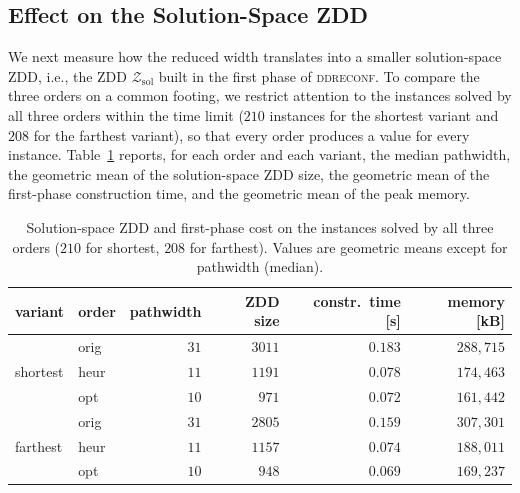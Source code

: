 \documentclass[conference]{IEEEtran}
\newcommand{\zsol}{\mathcal{Z}_{\mathrm{sol}}}
\newcommand{\OrigDecom}{\textsf{orig}\xspace}
\newcommand{\HeurDecom}{\textsf{heur}\xspace}
\newcommand{\OptDecom}{\textsf{opt}\xspace}
\begin{document}
\subsection{Effect on the Solution-Space ZDD}
\label{subsec:zddsize}
 
We next measure how the reduced width translates into a smaller solution-space
ZDD, i.e., the ZDD $\zsol$ built in the first phase of \textsc{ddreconf}.
To compare the three orders on a common footing, we restrict attention to the
instances solved by all three orders within the time limit ($210$ instances for
the shortest variant and $208$ for the farthest variant), so that every order
produces a value for every instance.
Table~\ref{tab:zddsize} reports, for each order and each variant, the median
pathwidth, the geometric mean of the solution-space ZDD size, the geometric mean
of the first-phase construction time, and the geometric mean of the peak memory.
 
\begin{table}[t]
  \centering
  \caption{Solution-space ZDD and first-phase cost on the instances solved by all
  three orders ($210$ for shortest, $208$ for farthest). Values are geometric
  means except for pathwidth (median).}
  \label{tab:zddsize}
  \begin{tabular}{llrrrr}
    \hline
    variant & order & pathwidth & ZDD size & constr.\ time [s] & memory [kB] \\
    \hline
    \multirow{3}{*}{shortest}
      & \OrigDecom & $31$ & $3011$ & $0.183$ & $288{,}715$ \\
      & \HeurDecom & $11$ & $1191$ & $0.078$ & $174{,}463$ \\
      & \OptDecom  & $10$ & $\phantom{0}971$ & $0.072$ & $161{,}442$ \\
    \hline
    \multirow{3}{*}{farthest}
      & \OrigDecom & $31$ & $2805$ & $0.159$ & $307{,}301$ \\
      & \HeurDecom & $11$ & $1157$ & $0.074$ & $188{,}011$ \\
      & \OptDecom  & $10$ & $\phantom{0}948$ & $0.069$ & $169{,}237$ \\
    \hline
  \end{tabular}
\end{table}
 
\end{document}
